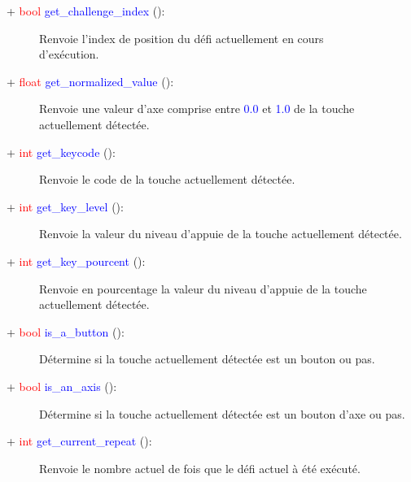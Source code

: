 \documentclass[a4paper, 11pt]{article}
\begin{document}
	\begin{description}
		\item [+ \textcolor{red}{bool} \textcolor{blue}{get\_challenge\_index} ():] Renvoie l'index de 
		position du défi actuellement en cours \\d'exécution.\\
	\end{description}
	\begin{description}
		\item [+ \textcolor{red}{float} \textcolor{blue}{get\_normalized\_value} ():] Renvoie une valeur
		d'axe comprise entre \textcolor{blue}{0.0} et \textcolor{blue}{1.0} de la touche actuellement 
		détectée.\\
	\end{description}
	\begin{description}
		\item [+ \textcolor{red}{int} \textcolor{blue}{get\_keycode} ():] Renvoie le code de la touche 
		actuellement détectée.\\
	\end{description}
	\begin{description}
		\item [+ \textcolor{red}{int} \textcolor{blue}{get\_key\_level} ():] Renvoie la valeur du niveau 
		d'appuie de la touche actuellement détectée.\\
	\end{description}
	\begin{description}
		\item [+ \textcolor{red}{int} \textcolor{blue}{get\_key\_pourcent} ():] Renvoie en pourcentage la 
		valeur du niveau d'appuie de la touche \\actuellement détectée.\\
	\end{description}
	\begin{description}
		\item [+ \textcolor{red}{bool} \textcolor{blue}{is\_a\_button} ():] Détermine si la touche 
		actuellement détectée est un bouton ou pas.\\
	\end{description}
	\begin{description}
		\item [+ \textcolor{red}{bool} \textcolor{blue}{is\_an\_axis} ():] Détermine si la touche 
		actuellement détectée est un bouton d'axe ou pas.\\
	\end{description}
	\begin{description}
		\item [+ \textcolor{red}{int} \textcolor{blue}{get\_current\_repeat} ():] Renvoie le nombre actuel 
		de fois que le défi actuel à été exécuté.
	\end{description}
\end{document}
